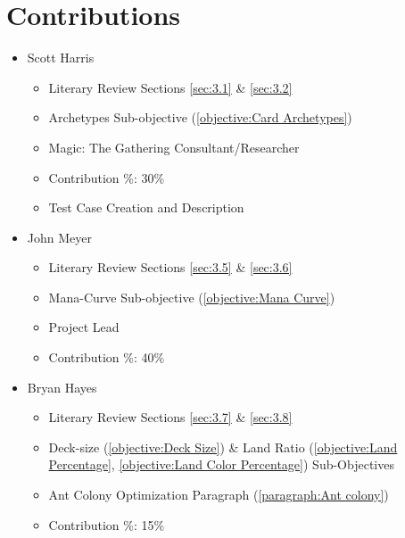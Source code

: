\documentclass[12pt, letterpaper]{article}
\begin{document}
\section{Contributions}

\begin{itemize}

\item Scott Harris

\begin{itemize}

    \item Literary Review Sections \ref{sec:3.1} \& \ref{sec:3.2}
    \item Archetypes Sub-objective (\ref{objective:Card Archetypes})
    \item Magic: The Gathering Consultant/Researcher
    \item Contribution \%: 30\%
    \item Test Case Creation and Description

\end{itemize}

\item John Meyer

\begin{itemize}

    \item Literary Review Sections \ref{sec:3.5} \& \ref{sec:3.6}
    \item Mana-Curve Sub-objective (\ref{objective:Mana Curve})
    \item Project Lead
    \item Contribution \%: 40\%

\end{itemize}

\item Bryan Hayes

\begin{itemize}

    \item Literary Review Sections \ref{sec:3.7} \& \ref{sec:3.8}
    \item Deck-size (\ref{objective:Deck Size}) \&
        Land Ratio (\ref{objective:Land Percentage}, \ref{objective:Land Color Percentage}) Sub-Objectives
    \item Ant Colony Optimization Paragraph (\ref{paragraph:Ant colony})
    \item Contribution \%: 15\%

\end{itemize}


\end{itemize}
\end{document}
